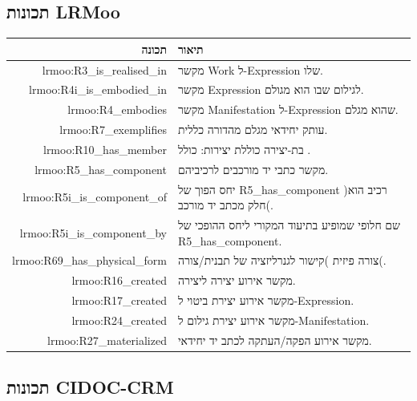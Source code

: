 \documentclass[12pt,a4paper]{article}
\newcommand{\en}[1]{\textenglish{\LR{#1}}}
\begin{document}
\subsection{תכונות LRMoo}

\begin{longtable}{|r|p{8cm}|}
\hline
\textbf{תכונה} & \textbf{תיאור} \\
\hline
\endhead

lrmoo:R3\_is\_realised\_in & מקשר Work ל-Expression שלו.\\
\hline
lrmoo:R4i\_is\_embodied\_in & מקשר Expression לגילום \en{(F3/F4 Manifestation)} שבו הוא מגולם.\\
\hline
lrmoo:R4\_embodies & מקשר Manifestation ל-Expression שהוא מגלם.\\
\hline
lrmoo:R7\_exemplifies & עותק יחידאי מגלם מהדורה כללית.\\
\hline
lrmoo:R10\_has\_member & בת-יצירה כוללת יצירות: \en{Work} כולל \en{Work}.\\
\hline
lrmoo:R5\_has\_component & מקשר כתבי יד מורכבים לרכיביהם.\\
\hline
lrmoo:R5i\_is\_component\_of & יחס הפוך של R5\_has\_component )רכיב הוא חלק מכתב יד מורכב(.\\
\hline
lrmoo:R5i\_is\_component\_by & שם חלופי שמופיע בתיעוד המקורי ליחס ההופכי של R5\_has\_component.\\
\hline
lrmoo:R69\_has\_physical\_form & צורה פיזית )קישור לגנרליזציה של תבנית/צורה(.\\
\hline
lrmoo:R16\_created & מקשר אירוע יצירה ליצירה.\\
\hline
lrmoo:R17\_created & מקשר אירוע יצירת ביטוי ל-Expression.\\
\hline
lrmoo:R24\_created & מקשר אירוע יצירת גילום ל-Manifestation.\\
\hline
lrmoo:R27\_materialized & מקשר אירוע הפקה/העתקה לכתב יד יחידאי.\\
\hline
\end{longtable}

\subsection{תכונות CIDOC-CRM}
\end{document}
